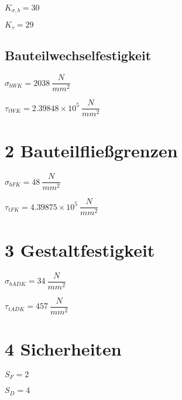 \documentclass[
]{article}
\begin{document}
\begin{center}

$K_{\sigma ,b} = 30$  

$K_{\tau} = 29$

\end{center}

\hypertarget{bauteilwechselfestigkeit}{%
\subsection{Bauteilwechselfestigkeit}\label{bauteilwechselfestigkeit}}

\begin{center}

$\sigma_{bWK} = 2038\ \dfrac{N}{mm^{2}}$

$\tau_{tWK} = \ensuremath{2.39848\times 10^{5}}\ \dfrac{N}{mm^{2}}$

\end{center}

\pagebreak

\hypertarget{bauteilflieuxdfgrenzen}{%
\section{2 Bauteilfließgrenzen}\label{bauteilflieuxdfgrenzen}}

\begin{center}  
$\sigma_{bFK} = 48\ \dfrac{N}{mm^{2}}$  

$\tau_{tFK} = \ensuremath{4.39875\times 10^{5}}\ \dfrac{N}{mm^{2}}$  
\end{center}

\hypertarget{gestaltfestigkeit}{%
\section{3 Gestaltfestigkeit}\label{gestaltfestigkeit}}

\begin{center}
$\sigma_{bADK} = 34\ \dfrac{N}{mm^{2}}$  

$\tau_{tADK} = 457\ \dfrac{N}{mm^{2}}$  
\end{center}

\hypertarget{sicherheiten}{%
\section{4 Sicherheiten}\label{sicherheiten}}

\begin{center}
$S_F = 2$  

$S_D = 4$
\end{center}
\end{document}
